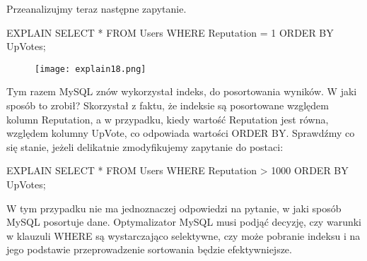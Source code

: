Przeanalizujmy teraz następne zapytanie.

\begin{spverbatim}
	EXPLAIN SELECT * FROM Users WHERE Reputation = 1 ORDER BY UpVotes;
\end{spverbatim}
\begin{figure}[H]
	\texttt{[image: explain18.png]} 
\end{figure}
Tym razem MySQL znów wykorzystał indeks, do posortowania wyników. W jaki sposób to zrobił? 
Skorzystał z faktu, że indeksie są posortowane względem kolumn Reputation, a w przypadku, kiedy wartość Reputation jest równa, względem kolumny UpVote, co odpowiada wartości ORDER BY.
Sprawdźmy co się stanie, jeżeli delikatnie zmodyfikujemy zapytanie do postaci:
\begin{spverbatim}
	EXPLAIN SELECT * FROM Users WHERE Reputation > 1000 ORDER BY UpVotes;
\end{spverbatim}

W tym przypadku nie ma jednoznaczej odpowiedzi na pytanie, w jaki sposób MySQL posortuje dane. Optymalizator MySQL musi podjąć decyzję, czy warunki w klauzuli WHERE są wystarczająco selektywne, czy może pobranie indeksu i na jego podstawie przeprowadzenie sortowania będzie efektywniejsze.
